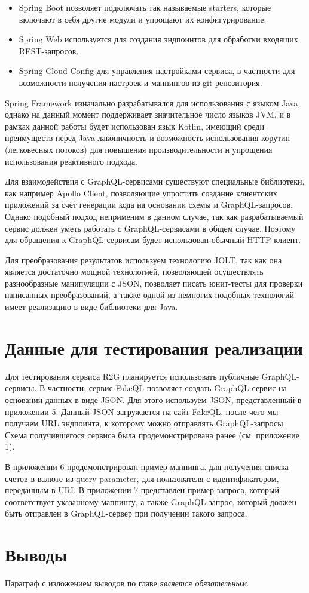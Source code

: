 \begin{itemize}
    \item Spring Boot позволяет подключать так называемые starters, которые включают в себя другие модули и упрощают их конфигурирование.
    \item Spring Web используется для создания эндпоинтов для обработки входящих REST-запросов.
    \item Spring Cloud Config для управления настройками сервиса, в частности для возможности получения настроек и маппингов из git-репозитория.
\end{itemize}

Spring Framework изначально разрабатывался для использования с языком Java, однако на данный момент поддерживает значительное число языков JVM, и в рамках данной работы будет использован язык Kotlin, имеющий среди преимуществ перед Java лаконичность и возможность использования корутин (легковесных потоков) для повышения производительности и упрощения использования реактивного подхода.

Для взаимодействия с GraphQL-сервисами существуют специальные библиотеки, как например Apollo Client, позволяющие упростить создание клиентских приложений за счёт генерации кода на основании схемы и GraphQL-запросов.
Однако подобный подход неприменим в данном случае, так как разрабатываемый сервис должен уметь работать с GraphQL-сервисами в общем случае.
Поэтому для обращения к GraphQL-сервисам будет использован обычный HTTP-клиент.

Для преобразования результатов используем технологию JOLT, так как она является достаточно мощной технологией, позволяющей осуществлять разнообразные манипуляции с JSON, позволяет писать юнит-тесты для проверки написанных преобразований, а также одной из немногих подобных технологий имеет реализацию в виде библиотеки для Java.


\section{Данные для тестирования реализации}\label{sec:testing-data}

Для тестирования сервиса R2G планируется использовать публичные GraphQL-сервисы.
В частности, сервис FakeQL позволяет создать GraphQL-сервис на основании данных в виде JSON. Для этого используем JSON, представленный в приложении 5.
Данный JSON загружается на сайт FakeQL, после чего мы получаем URL эндпоинта, к которому можно отправлять GraphQL-запросы.
Схема получившегося сервиса была продемонстрирована ранее (см. приложение 1).

В приложении 6 продемонстрирован пример маппинга.
для получения списка счетов в валюте из query parameter, для пользователя с идентификатором, переданным в URI. В приложении 7 представлен пример запроса, который соответствует указанному маппингу, а также GraphQL-запрос, который должен быть отправлен в GraphQL-сервер при получении такого запроса.


\section{Выводы} \label{sec:ch2-conclusion}

Параграф с изложением выводов по главе \textit{является обязательным}.